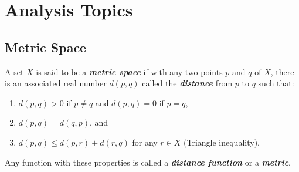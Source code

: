\section[Analysis Topics]{Analysis Topics}

\subsection{Metric Space}

\begin{definition}
	A set $X$ is said to be a \textbf{\textit{metric space}} if with any two points $p$ and $q$ of $X$, there is an associated real number $d(p,q)$ called the \textbf{\textit{distance}} from $p$ to $q$ such that:
	\begin{enumerate}
		\item $d(p,q) > 0$ if $p \neq q$ and $d(p,q) = 0$ if $p = q$,
		\item $d(p,q) = d(q,p)$, and
		\item $d(p,q) \leq d(p,r) + d(r,q)$ for any $r \in X$ (Triangle inequality).
	\end{enumerate}
\end{definition}

\begin{remark}
	Any function with these properties is called a \textit{\textbf{distance function}} or a \textit{\textbf{metric}}.
	
\end{remark}

